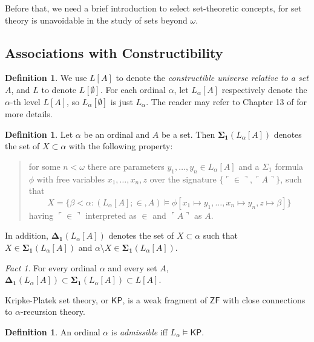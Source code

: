\documentclass[12pt, twoside]{memoir}
\numberwithin{equation}{section}
\theoremstyle{definition}
\newtheorem{defi}[thm]{Definition}
\theoremstyle{remark}
\newtheorem{fact}[thm]{Fact}
\theoremstyle{definition}
\theoremstyle{definition}
\theoremstyle{definition}
\theoremstyle{remark}
\begin{document}
Before that, we need a brief introduction to select set-theoretic concepts, for set theory is unavoidable in the study of sets beyond $\omega$.

\subsection{Associations with Constructibility}

\begin{defi}
We use $L[A]$ to denote the \emph{constructible universe relative to a set} $A$, and $L$ to denote $L[\emptyset]$. For each ordinal $\alpha$, let $L_{\alpha}[A]$ respectively denote the $\alpha$-th level $L[A]$, so $L_{\alpha}[\emptyset]$ is just $L_{\alpha}$. The reader may refer to Chapter 13 of \cite{jech} for more details.
\end{defi}

\begin{defi}
Let $\alpha$ be an ordinal and $A$ be a set. Then $\mathbf{\Sigma_1}(L_{\alpha}[A])$ denotes the set of $X \subset \alpha$ with the following property: 
\begin{quote}
    for some $n < \omega$ there are parameters $y_1, \dots, y_n \in L_{\alpha}[A]$ and a $\Sigma_1$ formula $\phi$ with free variables $x_1, \dots, x_{n}, z$ over the signature $\{\ulcorner \in \urcorner, \ulcorner A \urcorner\}$, such that 
    \begin{equation*}
        X = \{\beta < \alpha : (L_{\alpha}[A]; \in, A) \models \phi[x_1 \mapsto y_1, \dots, x_n \mapsto y_n, z \mapsto \beta]\}
    \end{equation*}
    having $\ulcorner \in \urcorner$ interpreted as $\in$ and $\ulcorner A \urcorner$ as $A$.
\end{quote}
In addition, $\mathbf{\Delta_1}(L_{\alpha}[A])$ denotes the set of $X \subset \alpha$ such that $X \in \mathbf{\Sigma_1}(L_{\alpha}[A])$ and $\alpha \setminus X \in \mathbf{\Sigma_1}(L_{\alpha}[A])$.
\end{defi}

\begin{fact}
For every ordinal $\alpha$ and every set $A$, $\mathbf{\Delta_1}(L_{\alpha}[A]) \subset \mathbf{\Sigma_1}(L_{\alpha}[A]) \subset L[A]$.
\end{fact}

Kripke-Platek set theory, or $\mathsf{KP}$, is a weak fragment of $\mathsf{ZF}$ with close connections to $\alpha$-recursion theory.

\begin{defi}
An ordinal $\alpha$ is \emph{admissible} iff $L_{\alpha} \models \mathsf{KP}$.
\end{defi}
\end{document}
